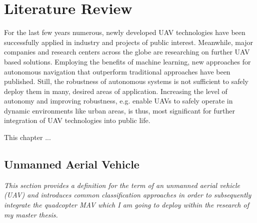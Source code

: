 \chapter{Literature Review}

\label{Chapter2} %

For the last few years
numerous, newly developed
UAV technologies have been
successfully applied in 
industry and
projects of public interest.
Meanwhile, 
major companies and
research centers across the globe
are researching on further UAV based solutions.
Employing the benefits of machine learning, 
new approaches for autonomous navigation
that outperform traditional approaches 
have been published.
Still, the robustness
of autonomous systems 
is not sufficient to
safely deploy them in many, desired
areas of application. 
Increasing the level of autonomy and
improving robustness,
e.g. enable UAVs to safely operate in 
dynamic environments like urban areas,
is thus, most significant
for further 
integration of
UAV technologies
into public life.

This chapter ...



\section{Unmanned Aerial Vehicle}

\label{Chapter2Section1}

\textit{This section provides a definition 
for the term of an unmanned aerial vehicle (UAV)
and introduces common classification approaches
in order to subsequently integrate the
quadcopter MAV 
which I am going to deploy 
within the research of my master thesis.}


